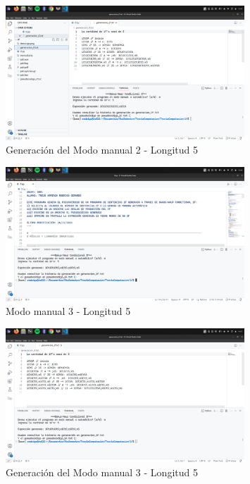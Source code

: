\documentclass[11pt]{article} %
\begin{document}
	\newpage
	
	
	\begin{figure}[h]
		\centering
		\includegraphics[width=0.8\textwidth]{arch2,2}
		\caption{Generación del Modo manual 2 - Longitud 5}
	\end{figure}
	
	\begin{figure}[h]
		\centering
		\includegraphics[width=0.8\textwidth]{manual3.png}
		\caption{Modo manual 3 - Longitud 5}
	\end{figure}
	
	\newpage
	
	\newpage
	
	\begin{figure}[h]
		\centering
		\includegraphics[width=0.8\textwidth]{arch3,1}
		\caption{Generación del Modo manual 3 - Longitud 5}
	\end{figure}
	
\end{document}
